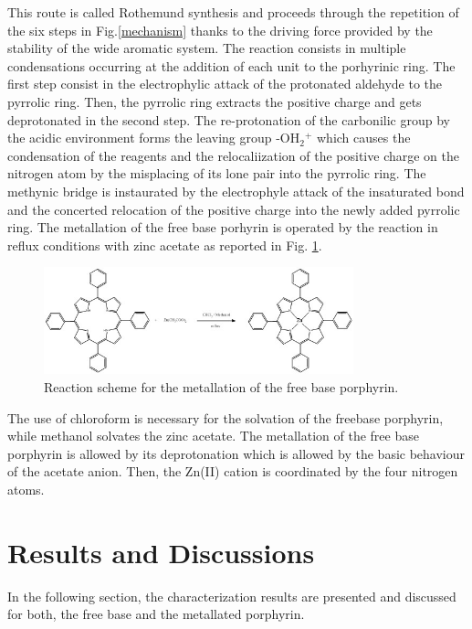 \documentclass[num-refs]{wiley-article}
\begin{document}
This route is called Rothemund synthesis and proceeds through the repetition of the six steps in Fig.\ref{mechanism} thanks to the driving force provided by the stability of the wide aromatic system.
The reaction consists in multiple condensations occurring at the addition of each unit to the porhyrinic ring.
The first step consist in the electrophylic attack of the protonated aldehyde to the pyrrolic ring.
Then, the pyrrolic ring extracts the positive charge and gets deprotonated in the second step.
The re-protonation of the carbonilic group by the acidic environment forms the leaving group -OH$_{2}$$^{+}$ which causes the condensation of the reagents and the relocaliization of the positive charge on the nitrogen atom by the misplacing of its lone pair into the pyrrolic ring.
The methynic bridge is instaurated by the electrophyle attack of the insaturated bond and the concerted relocation of the positive charge into the newly added pyrrolic ring.
\break
The metallation of the free base porhyrin is operated by the reaction in reflux conditions with zinc acetate as reported in Fig. \ref{metalation}.
\begin{figure}
    \centering
    \includegraphics[width=0.8\textwidth]{Zn-TPP reaction}
    \caption{Reaction scheme for the metallation of the free base porphyrin.}
    \label{metalation}
\end{figure}
The use of chloroform is necessary for the solvation of the freebase porphyrin, while methanol solvates the zinc acetate.
The metallation of the free base porphyrin is allowed by its deprotonation which is allowed by the basic behaviour of the acetate anion.
Then, the Zn(II) cation is coordinated by the four nitrogen atoms.


\section{Results and Discussions}
In the following section, the characterization results are presented and discussed for both, the free base and the metallated porphyrin.
\end{document}
